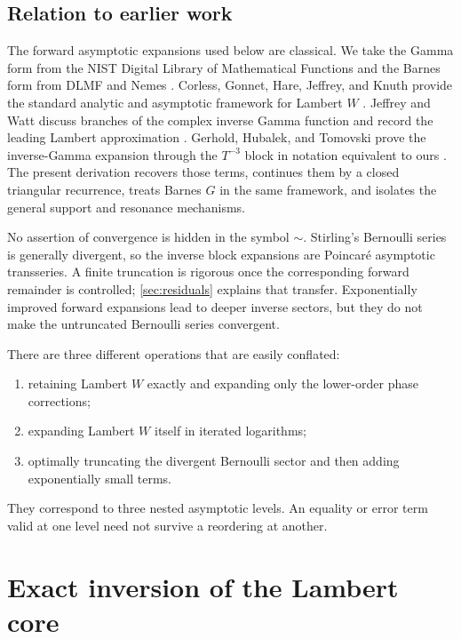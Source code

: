 \documentclass[11pt,oneside]{article}
\theoremstyle{plain}
\theoremstyle{definition}
\theoremstyle{remark}
\begin{document}
\subsection{Relation to earlier work}

The forward asymptotic expansions used below are classical.  We take the
Gamma form from the NIST Digital Library of Mathematical Functions
\cite{DLMF511} and the Barnes form from DLMF and Nemes
\cite{DLMF517,NemesBarnes}.  Corless, Gonnet, Hare, Jeffrey, and Knuth provide
the standard analytic and asymptotic framework for Lambert \(W\)
\cite{CorlessEtAl}.  Jeffrey and Watt discuss branches of the complex inverse
Gamma function and record the leading Lambert approximation
\cite{JeffreyWatt}.  Gerhold, Hubalek, and Tomovski prove the inverse-Gamma
expansion through the \(T^{-3}\) block in notation equivalent to ours
\cite{GerholdHubalekTomovski}.  The present derivation recovers those terms,
continues them by a closed triangular recurrence, treats Barnes \(G\) in the
same framework, and isolates the general support and resonance mechanisms.

No assertion of convergence is hidden in the symbol \(\sim\).  Stirling's
Bernoulli series is generally divergent, so the inverse block expansions are
Poincar\'e asymptotic transseries.  A finite truncation is rigorous once the
corresponding forward remainder is controlled; \cref{sec:residuals} explains
that transfer.  Exponentially improved forward expansions lead to deeper
inverse sectors, but they do not make the untruncated Bernoulli series
convergent.

\begin{warningbox}
There are three different operations that are easily conflated:
\begin{enumerate}
\item retaining Lambert \(W\) exactly and expanding only the lower-order
      phase corrections;
\item expanding Lambert \(W\) itself in iterated logarithms;
\item optimally truncating the divergent Bernoulli sector and then adding
      exponentially small terms.
\end{enumerate}
They correspond to three nested asymptotic levels.  An equality or error term
valid at one level need not survive a reordering at another.
\end{warningbox}

\section{Exact inversion of the Lambert core}
\label{sec:core}
\end{document}
